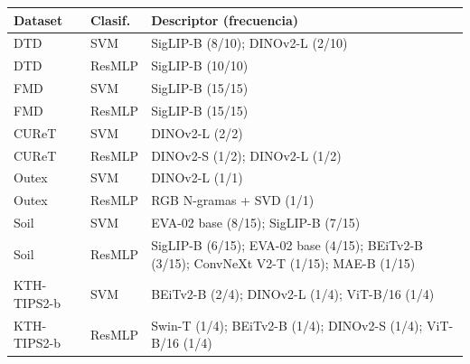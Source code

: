 \begin{resulttable}
\centering\fontsize{8}{10}\selectfont\setlength{\tabcolsep}{3.0pt}
\caption{Descriptor Individual seleccionado mediante validación interna. La frecuencia indica en cuántas condiciones externas fue elegido.}
\label{tab:individual-identidad}
\begin{tabular}{@{}lll@{}}
\toprule
Dataset & Clasif. & Descriptor (frecuencia) \\
\midrule
DTD & SVM & SigLIP-B (8/10); DINOv2-L (2/10) \\
DTD & ResMLP & SigLIP-B (10/10) \\
FMD & SVM & SigLIP-B (15/15) \\
FMD & ResMLP & SigLIP-B (15/15) \\
CUReT & SVM & DINOv2-L (2/2) \\
CUReT & ResMLP & DINOv2-S (1/2); DINOv2-L (1/2) \\
Outex & SVM & DINOv2-L (1/1) \\
Outex & ResMLP & RGB N-gramas + SVD (1/1) \\
Soil & SVM & EVA-02 base (8/15); SigLIP-B (7/15) \\
Soil & ResMLP & SigLIP-B (6/15); EVA-02 base (4/15); BEiTv2-B (3/15); ConvNeXt V2-T (1/15); MAE-B (1/15) \\
KTH-TIPS2-b & SVM & BEiTv2-B (2/4); DINOv2-L (1/4); ViT-B/16 (1/4) \\
KTH-TIPS2-b & ResMLP & Swin-T (1/4); BEiTv2-B (1/4); DINOv2-S (1/4); ViT-B/16 (1/4) \\
\bottomrule
\end{tabular}
\end{resulttable}
\FloatBarrier
